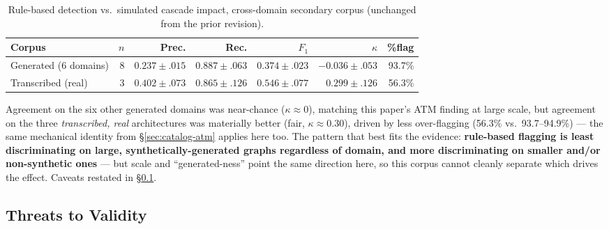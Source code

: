 \documentclass[sigconf,9pt]{acmart}
\begin{document}
\begin{table}[t]
\caption{Rule-based detection vs.\ simulated cascade impact, cross-domain secondary corpus
(unchanged from the prior revision).}
\label{tab:secondary}
\tiny
\setlength{\tabcolsep}{2pt}
\begin{tabular}{@{}lrrrrrr@{}}
\toprule
\textbf{Corpus} & \textbf{$n$} & \textbf{Prec.} & \textbf{Rec.} & \textbf{$F_1$} &
\textbf{$\kappa$} & \textbf{\%flag} \\
\midrule
Generated (6 domains) & 8 & $0.237{\pm}.015$ & $0.887{\pm}.063$ & $0.374{\pm}.023$ &
$-0.036{\pm}.053$ & 93.7\% \\
Transcribed (real) & 3 & $0.402{\pm}.073$ & $0.865{\pm}.126$ & $0.546{\pm}.077$ &
$0.299{\pm}.126$ & 56.3\% \\
\bottomrule
\end{tabular}
\end{table}

Agreement on the six other generated domains was near-chance ($\kappa \approx 0$), matching this
paper's ATM finding at large scale, but agreement on the three \emph{transcribed, real}
architectures was materially better (fair, $\kappa \approx 0.30$), driven by less over-flagging
(56.3\% vs.\ 93.7--94.9\%) --- the same mechanical identity from \S\ref{sec:catalog-atm} applies
here too. The pattern that best fits the evidence: \textbf{rule-based flagging is least
discriminating on large, synthetically-generated graphs regardless of domain, and more
discriminating on smaller and/or non-synthetic ones} --- but scale and ``generated-ness'' point the
same direction here, so this corpus cannot cleanly separate which drives the effect. Caveats
restated in \S\ref{sec:threats}.

\subsection{Threats to Validity}
\label{sec:threats}
\end{document}
